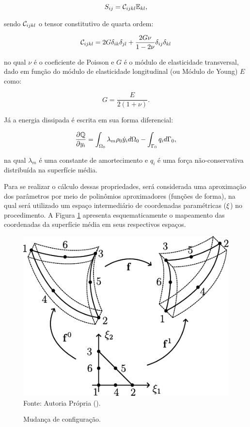 \begin{equation}
    S_{ij}=\mathcal{C}_{ijkl}\mathbb{E}_{kl}\text{,}
    \label{eq:CSD-S}
\end{equation}

\noindent sendo $\mathcal{C}_{ijkl}$ o tensor constitutivo de quarta ordem:

\begin{equation}
    \mathcal{C}_{ijkl}=2G\delta_{ik}\delta_{jl}+\frac{2G\nu}{1-2\nu}\delta_{ij}\delta_{kl}
\end{equation}

\noindent no qual $\nu$ é o coeficiente de Poisson e $G$ é o módulo de elasticidade transversal, dado em função do módulo de elasticidade longitudinal (ou Módulo de Young) $E$ como:

\begin{equation}
    G=\frac{E}{2(1+\nu)}\text{.}
\end{equation}

Já a energia dissipada é escrita em sua forma diferencial:

\begin{equation}
    \frac{\partial{\mathbb{Q}}}{\partial{y_i}}=\int_{\Omega_0}{\lambda_m\rho_0\dot{y}_i d\Omega_0}-\int_{\Gamma_0}{q_i d\Gamma_0}\text{,}
\end{equation}

\noindent na qual $\lambda_m$ é uma constante de amortecimento e $q_i$ é uma força não-conservativa distribuída na superfície média.

Para se realizar o cálculo dessas propriedades, será considerada uma aproximação dos parâmetros por meio de polinômios aproximadores (funções de forma), na qual será utilizado um espaço intermediário de coordenadas paramétricas ($\mathbf{\xi}$) no procedimento. A Figura \ref{fig:Mapeamento} apresenta esquematicamente o mapeamento das coordenadas da superfície média em seus respectivos espaços.

\begin{figure}[h]
    \centering
    \caption{Mudança de configuração.}
    \includegraphics[width=.4\linewidth]{Figuras/Mapeamento.pdf}
    \\Fonte: Autoria Própria (\the\year).
    \label{fig:Mapeamento}
\end{figure}

